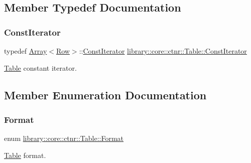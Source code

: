 \subsection{Member Typedef Documentation}
\mbox{\label{classlibrary_1_1core_1_1ctnr_1_1_table_a7fa78ad4e7e8d27ceab0bff51ab84fc3}} 
\subsubsection{\texorpdfstring{Const\+Iterator}{ConstIterator}}
{\footnotesize\ttfamily typedef \hyperlink{classlibrary_1_1core_1_1ctnr_1_1_array}{Array}$<$\hyperlink{classlibrary_1_1core_1_1ctnr_1_1table_1_1_row}{Row}$>$\+::\hyperlink{classlibrary_1_1core_1_1ctnr_1_1_table_a7fa78ad4e7e8d27ceab0bff51ab84fc3}{Const\+Iterator} \hyperlink{classlibrary_1_1core_1_1ctnr_1_1_table_a7fa78ad4e7e8d27ceab0bff51ab84fc3}{library\+::core\+::ctnr\+::\+Table\+::\+Const\+Iterator}}



\hyperlink{classlibrary_1_1core_1_1ctnr_1_1_table}{Table} constant iterator. 



\subsection{Member Enumeration Documentation}
\mbox{\label{classlibrary_1_1core_1_1ctnr_1_1_table_ab1d81689432c3a6bc960d33db1e11a4c}} 
\subsubsection{\texorpdfstring{Format}{Format}}
{\footnotesize\ttfamily enum \hyperlink{classlibrary_1_1core_1_1ctnr_1_1_table_ab1d81689432c3a6bc960d33db1e11a4c}{library\+::core\+::ctnr\+::\+Table\+::\+Format}\hspace{0.3cm}{\ttfamily [strong]}}



\hyperlink{classlibrary_1_1core_1_1ctnr_1_1_table}{Table} format. 

